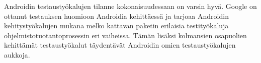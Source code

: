 Androidin testaustyökalujen tilanne kokonaisuudessaan on varsin hyvä. Google on ottanut testauksen huomioon Androidia kehittäessä ja tarjoaa Androidin kehitystyökalujen mukana melko kattavan paketin erilaisia testityökaluja ohjelmistotuotantoprosessin eri vaiheissa. Tämän lisäksi kolmansien osapuolien kehittämät testaustyökalut täydentävät Androidin omien testaustyökalujen aukkoja.